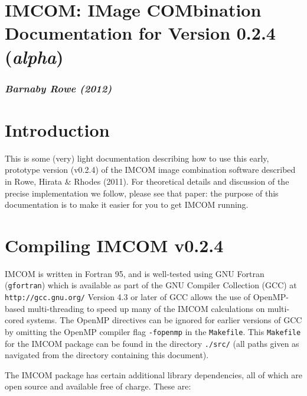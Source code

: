 \documentclass[10pt]{article}
\begin{document}
\setlength{\parskip}{2.0ex plus 0.5ex minus 0.5ex}
\setlength{\parindent}{0cm} 

\section*{IMCOM: IMage COMbination \\ Documentation for Version 0.2.4 (\emph{alpha})}
\subsubsection*{\emph{Barnaby Rowe (2012)}}

\section{Introduction}
This is some (very) light documentation describing how to use this early, prototype version (v0.2.4) of the IMCOM image combination software described in Rowe, Hirata \& Rhodes (2011).  For theoretical details and discussion of the precise implementation we follow, please see that paper: the purpose of this documentation is to make it easier for you to get IMCOM running.

\section{Compiling IMCOM v0.2.4}
IMCOM is written in Fortran 95, and is well-tested using GNU Fortran (\texttt{gfortran}) which is available as part of the GNU Compiler Collection (GCC) at \newline
\texttt{http://gcc.gnu.org/} \newline
Version 4.3 or later of GCC allows the use of OpenMP-based multi-threading to speed up many of the IMCOM calculations on multi-cored systems.  The OpenMP directives can be ignored for earlier versions of GCC by omitting the OpenMP compiler flag \texttt{-fopenmp} in the \texttt{Makefile}.  This \texttt{Makefile} for the IMCOM package can be found in the directory \texttt{./src/} (all paths given as navigated from the directory containing this document).

The IMCOM package has certain additional library dependencies, all of which are open source and available free of charge.  These are:
\end{document}
